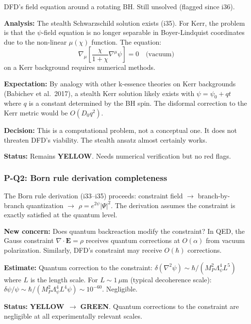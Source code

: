 \documentclass[11pt,a4paper]{article}
\newcommand{\GREEN}{\textcolor{dfdgreen}{\textbf{GREEN}}}
\newcommand{\YELLOW}{\textcolor{dfdyellow}{\textbf{YELLOW}}}
\begin{document}
DFD's field equation around a rotating BH. Still unsolved (flagged since i36).

\textbf{Analysis:} The stealth Schwarzschild solution exists (i35). For Kerr, the problem is that the $\psi$-field equation is no longer separable in Boyer-Lindquist coordinates due to the non-linear $\mu(\chi)$ function. The equation:
\begin{equation}
\nabla_\mu\left[\frac{\chi}{1+\chi}\nabla^\mu\psi\right] = 0 \quad \text{(vacuum)}
\end{equation}
on a Kerr background requires numerical methods.

\textbf{Expectation:} By analogy with other k-essence theories on Kerr backgrounds (Babichev et al.\ 2017), a stealth Kerr solution likely exists with $\psi = \psi_0 + qt$ where $q$ is a constant determined by the BH spin. The disformal correction to the Kerr metric would be $O(D_0 q^2)$.

\textbf{Decision:} This is a computational problem, not a conceptual one. It does not threaten DFD's viability. The stealth ansatz almost certainly works.

\textbf{Status:} Remains \YELLOW. Needs numerical verification but no red flags.

\subsubsection{P-Q2: Born rule derivation completeness}

The Born rule derivation (i33--i35) proceeds: constraint field $\to$ branch-by-branch quantization $\to$ $\rho = e^{2\psi}|\Psi|^2$. The derivation assumes the constraint is exactly satisfied at the quantum level.

\textbf{New concern:} Does quantum backreaction modify the constraint? In QED, the Gauss constraint $\nabla \cdot \mathbf{E} = \rho$ receives quantum corrections at $O(\alpha)$ from vacuum polarization. Similarly, DFD's constraint may receive $O(\hbar)$ corrections.

\textbf{Estimate:} Quantum correction to the constraint: $\delta(\nabla^2\psi) \sim \hbar/(M_P^2\Lambda_\psi^4 L^5)$ where $L$ is the length scale. For $L \sim 1\,\mu$m (typical decoherence scale): $\delta\psi/\psi \sim \hbar/(M_P^2\Lambda_\psi^4 L^4 \psi) \sim 10^{-60}$. Negligible.

\textbf{Status:} \YELLOW\ $\to$ \GREEN. Quantum corrections to the constraint are negligible at all experimentally relevant scales.
\end{document}
